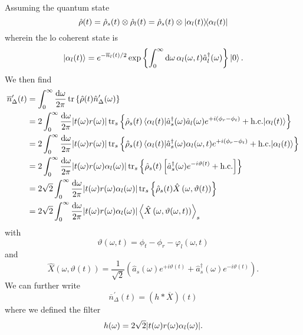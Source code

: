 Assuming the quantum state~\cite[p.~213]{Vogel2006}
\begin{equation}
	\hat\rho(t)
	=
	\hat\rho_s(t)
	\otimes
	\hat\rho_l(t)
	=
	\hat\rho_s(t)
	\otimes
	\ketbra{\alpha_l(t)}
\end{equation}
wherein the \gls{lo} coherent state is
\begin{equation}
	\ket{\alpha_l(t)}
	=
	e^{-\overline{n}_l(t)/2}
	\exp\left\{
		\int_0^\infty\dd{\omega}
		\alpha_l(\omega,t)
		\hat{a}_l^\dagger(\omega)
	\right\}
	\ket{0}
	.
\end{equation}
We then find
\begin{equation}
	\begin{split}
		\overline{n}^\prime_\Delta(t)
		&=
		\int_0^\infty\frac{\dd{\omega}}{2\pi}
		\tr\left\{
			\hat\rho(t)
			\hat{n}_\Delta^\prime(\omega)
		\right\}
		\\
		&=
		2
		\int_0^\infty\frac{\dd{\omega}}{2\pi}
		\abs{t(\omega)r(\omega)}
		\tr_s\left\{
			\hat\rho_s(t)
			\expval{
				\hat{a}_s^\dagger(\omega)
				\hat{a}_l(\omega)
				e^{+i(\phi_r-\phi_t)}
				+
				\text{h.c.}
			}{\alpha_l(t)}
		\right\}
		\\
		&=
		2
		\int_0^\infty\frac{\dd{\omega}}{2\pi}
		\abs{t(\omega)r(\omega)}
		\tr_s\left\{
			\hat\rho_s(t)
			\expval{
				\hat{a}_s^\dagger(\omega)
				\alpha_l(\omega,t)
				e^{+i(\phi_r-\phi_t)}
				+
				\text{h.c.}
			}{\alpha_l(t)}
		\right\}
		\\
		&=
		2
		\int_0^\infty\frac{\dd{\omega}}{2\pi}
		\abs{t(\omega)r(\omega)\alpha_l(\omega)}
		\tr_s\left\{
			\hat\rho_s(t)
			\left[
				\hat{a}_s^\dagger(\omega)
				e^{-i\vartheta(t)}
				+
				\text{h.c.}
			\right]
		\right\}
		\\
		&=
		2\sqrt{2}
		\int_0^\infty\frac{\dd{\omega}}{2\pi}
		\abs{t(\omega)r(\omega)\alpha_l(\omega)}
		\tr_s\left\{
			\hat\rho_s(t)
			\hat{X}\left(\omega,\vartheta(t)\right)
		\right\}
		\\
		&=
		2\sqrt{2}
		\int_0^\infty\frac{\dd{\omega}}{2\pi}
		\abs{t(\omega)r(\omega)\alpha_l(\omega)}
		\expval{\hat{X}\left(\omega,\vartheta(\omega,t)\right)}_s
	\end{split}
\end{equation}
with
\begin{equation}
	\vartheta(\omega,t)
	=
	\phi_t-\phi_r-\varphi_l(\omega,t)
\end{equation}
and
\begin{equation}
	\hat{X}\left(\omega,\vartheta(t)\right)
	=
	\frac{1}{\sqrt{2}}
	\left(
		\hat{a}_s(\omega)
		e^{+i\vartheta(t)}
		+
		\hat{a}_s^\dagger(\omega)
		e^{-i\vartheta(t)}
	\right)
	.
\end{equation}
We can further write
\begin{equation}
	\overline{n}^\prime_\Delta(t)
	=
	\left(h*\overline{X}\right)(t)
\end{equation}
where we defined the filter
\begin{equation}
	h(\omega)
	=
	2\sqrt{2}
	\abs{t(\omega)r(\omega)\alpha_l(\omega)}
	.
\end{equation}

